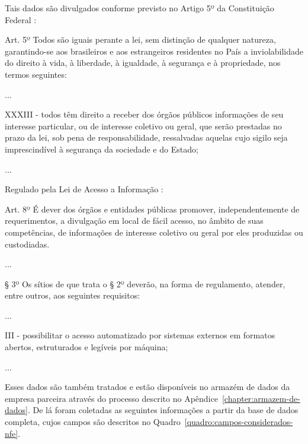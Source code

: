 Tais dados são divulgados conforme previsto no Artigo 5º da Constituição Federal \cite{constituicao:1988}:

\begin{citacao}
Art. 5º Todos são iguais perante a lei, sem distinção de qualquer natureza, garantindo-se aos brasileiros e aos estrangeiros residentes no País a inviolabilidade do direito à vida, à liberdade, à igualdade, à segurança e à propriedade, nos termos seguintes:

...

XXXIII - todos têm direito a receber dos órgãos públicos informações de seu interesse particular, ou de interesse coletivo ou geral, que serão prestadas no prazo da lei, sob pena de responsabilidade, ressalvadas aquelas cujo sigilo seja imprescindível à segurança da sociedade e do Estado;

...
\end{citacao}

Regulado pela Lei de Acesso a Informação \cite{lei:12527:lei-de-acesso-a-informacao}:

\begin{citacao}
Art. 8º É dever dos órgãos e entidades públicas promover, independentemente de requerimentos, a divulgação em local de fácil acesso, no âmbito de suas competências, de informações de interesse coletivo ou geral por eles produzidas ou custodiadas.

...

§ 3º Os sítios de que trata o § 2º deverão, na forma de regulamento, atender, entre outros, aos seguintes requisitos:

...

III - possibilitar o acesso automatizado por sistemas externos em formatos abertos, estruturados e legíveis por máquina;

...
\end{citacao}

Esses dados são também tratados e estão disponíveis no armazém de dados da empresa parceira através do processo descrito no Apêndice~\ref{chapter:armazem-de-dados}. De lá foram coletadas as seguintes informações a partir da base de dados completa, cujos campos são descritos no Quadro~\ref{quadro:campos-considerados-nfe}.

